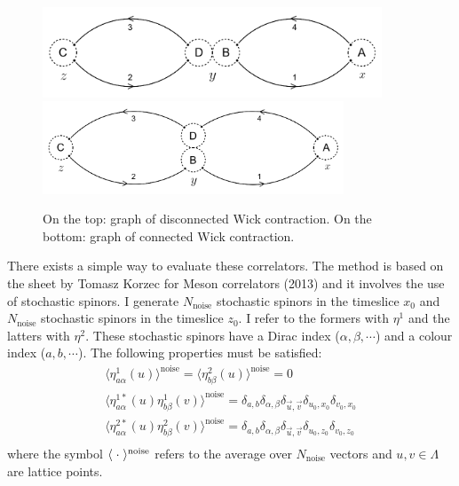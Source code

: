 \documentclass[11pt,a4paper]{article}
\begin{document}
\begin{figure}[h!]
    \centering
    \includegraphics[width=0.9\textwidth]{include-imgs/Wick_disconnected.png}
    \includegraphics[width=0.8\textwidth]{include-imgs/Wick_connected.png}
    \caption{On the top: graph of disconnected Wick contraction. On the bottom: graph of connected Wick contraction.}
\end{figure}\label{figura_fig}
\newline
There exists a simple way to evaluate these correlators.
The method is based on the sheet by Tomasz Korzec for Meson correlators (2013) and it involves the use of stochastic spinors.
I generate $N_{\text{noise}}$ stochastic spinors in the timeslice $x_0$ and $N_{\text{noise}}$ stochastic spinors in the timeslice $z_0$.
I refer to the formers with $\eta^{1}$ and the latters with $\eta^{2}$.
These stochastic spinors have a Dirac index ($\alpha,\beta,\cdots$) and a colour index ($a,b,\cdots$).
The following properties must be satisfied:
\begin{equation}
    \begin{gathered}
        \langle \eta^{1}_{a\alpha} (u) \rangle^{\text{noise}} = \langle \eta^{2}_{b\beta} (u) \rangle^{\text{noise}} = 0 \\
        \langle \eta^{1*}_{a\alpha} (u) \eta^{1}_{b\beta} (v) \rangle^{\text{noise}} = \delta_{a,b} \delta_{\alpha,\beta} \delta_{\vec u, \vec v} \delta_{u_0,x_0} \delta_{v_0,x_0} \\
        \langle \eta^{2*}_{a\alpha} (u) \eta^{2}_{b\beta} (v) \rangle^{\text{noise}} = \delta_{a,b} \delta_{\alpha,\beta} \delta_{\vec u, \vec v} \delta_{u_0,z_0} \delta_{v_0,z_0} \\
    \end{gathered}
\end{equation}
where the symbol $\langle\hspace{1mm}\cdot\hspace{1mm}\rangle^\text{noise}$ refers to the average over $N_{\text{noise}}$ vectors and $u,v \in \Lambda$ are lattice points.
\end{document}
